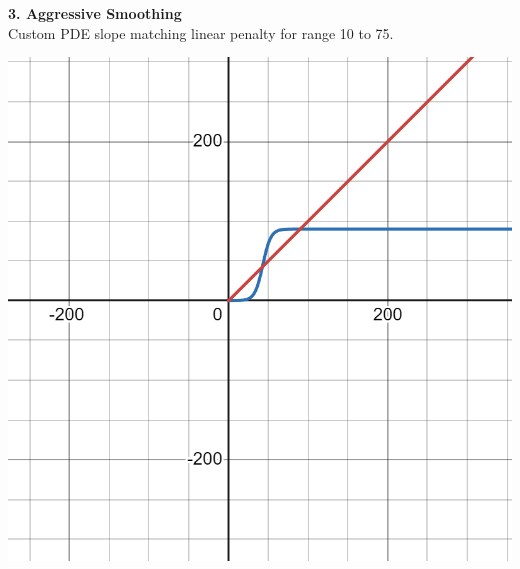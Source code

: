 \documentclass{article}
\begin{document}
  \newpage
  \noindent
  \textbf{3. Aggressive Smoothing}\\
  Custom PDE slope matching linear penalty for range 10 to 75.\\
  \begin{center}
    \includegraphics[scale=0.1]{../report_images/aggressive_smoothing.png}\\
  \end{center}
\end{document}
